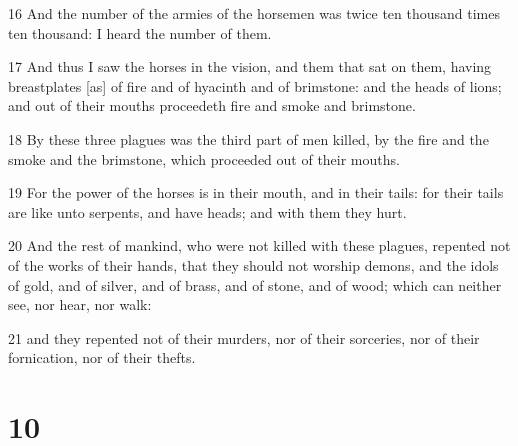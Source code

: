 \par 16 And the number of the armies of the horsemen was twice ten thousand times ten thousand: I heard the number of them.
\par 17 And thus I saw the horses in the vision, and them that sat on them, having breastplates [as] of fire and of hyacinth and of brimstone: and the heads of lions; and out of their mouths proceedeth fire and smoke and brimstone.
\par 18 By these three plagues was the third part of men killed, by the fire and the smoke and the brimstone, which proceeded out of their mouths.
\par 19 For the power of the horses is in their mouth, and in their tails: for their tails are like unto serpents, and have heads; and with them they hurt.
\par 20 And the rest of mankind, who were not killed with these plagues, repented not of the works of their hands, that they should not worship demons, and the idols of gold, and of silver, and of brass, and of stone, and of wood; which can neither see, nor hear, nor walk:
\par 21 and they repented not of their murders, nor of their sorceries, nor of their fornication, nor of their thefts.

\chapter{10}

